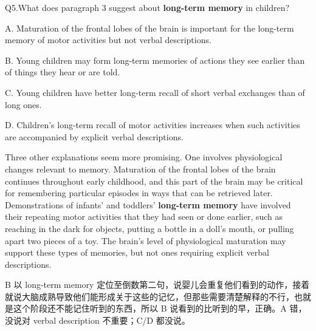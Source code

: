 \begin{blk}
    \begin{qst}
        Q5.What does paragraph 3 suggest about \textbf{long-term memory} in children?
    \end{qst}

    \begin{chc}
        A. Maturation of the frontal lobes of the brain is important for the long-term memory of motor activities but not verbal descriptions.

        B. Young children may form long-term memories of actions they see earlier than of things they hear or are told.

        C. Young children have better long-term recall of short verbal exchanges than of long ones.

        D. Children’s long-term recall of motor activities increases when such activities are accompanied by explicit verbal descriptions.
    \end{chc}

    \begin{psgq}
        Three other explanations seem more promising. One involves physiological changes relevant to memory. Maturation of the frontal lobes of the brain continues throughout early childhood, and this part of the brain may be critical for remembering particular episodes in ways that can be retrieved later. Demonstrations of infants’ and toddlers' \textbf{long-term memory} have involved their repeating motor activities that they had seen or done earlier, such as reaching in the dark for objects, putting a bottle in a doll’s mouth, or pulling apart two pieces of a toy. The brain’s level of physiological maturation may support these types of memories, but not ones requiring explicit verbal descriptions.
    \end{psgq}

    \begin{nlz}
        B 以 long-term memory 定位至倒数第二句，说婴儿会重复他们看到的动作，接着就说大脑成熟导致他们能形成关于这些的记忆，但那些需要清楚解释的不行，也就是这个阶段还不能记住听到的东西，所以 B 说看到的比听到的早，正确。A 错，没说对 verbal description 不重要；C/D 都没说。
    \end{nlz}
\end{blk}

